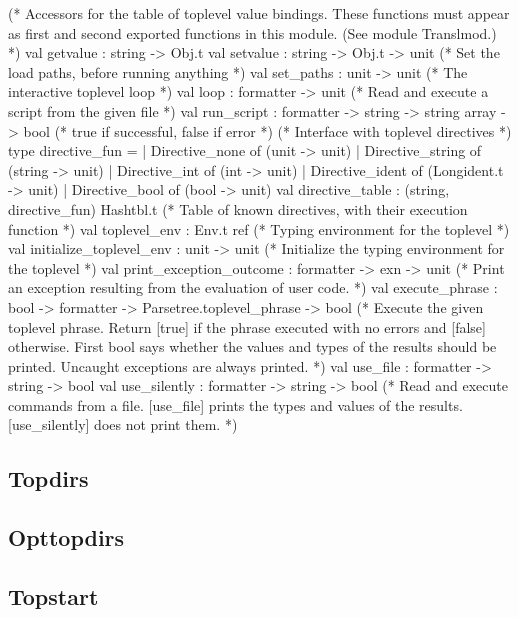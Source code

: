 \begin{ocamlcode}
(* Accessors for the table of toplevel value bindings.  These functions
   must appear as first and second exported functions in this module.
   (See module Translmod.) *)
val getvalue : string -> Obj.t
val setvalue : string -> Obj.t -> unit
(* Set the load paths, before running anything *)
val set_paths : unit -> unit
(* The interactive toplevel loop *)
val loop : formatter -> unit
(* Read and execute a script from the given file *)
val run_script : formatter -> string -> string array -> bool
        (* true if successful, false if error *)
(* Interface with toplevel directives *)
type directive_fun =
   | Directive_none of (unit -> unit)
   | Directive_string of (string -> unit)
   | Directive_int of (int -> unit)
   | Directive_ident of (Longident.t -> unit)
   | Directive_bool of (bool -> unit)
val directive_table : (string, directive_fun) Hashtbl.t
        (* Table of known directives, with their execution function *)
val toplevel_env : Env.t ref
        (* Typing environment for the toplevel *)
val initialize_toplevel_env : unit -> unit
        (* Initialize the typing environment for the toplevel *)
val print_exception_outcome : formatter -> exn -> unit
        (* Print an exception resulting from the evaluation of user code. *)
val execute_phrase : bool -> formatter -> Parsetree.toplevel_phrase -> bool
        (* Execute the given toplevel phrase. Return [true] if the
           phrase executed with no errors and [false] otherwise.
           First bool says whether the values and types of the results
           should be printed. Uncaught exceptions are always printed. *)
val use_file : formatter -> string -> bool
val use_silently : formatter -> string -> bool
        (* Read and execute commands from a file.
           [use_file] prints the types and values of the results.
           [use_silently] does not print them. *)
\end{ocamlcode}


\subsection{Topdirs}
\subsection{Opttopdirs}



\subsection{Topstart}
